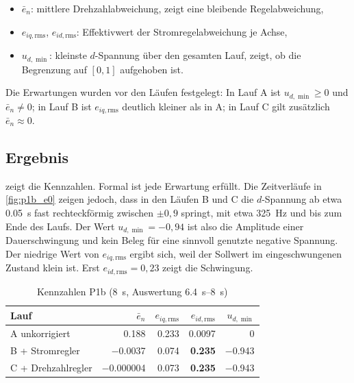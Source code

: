 \begin{itemize}
  \item $\bar e_n$: mittlere Drehzahlabweichung, zeigt eine bleibende Regelabweichung,
  \item $e_{iq,\mathrm{rms}}$, $e_{id,\mathrm{rms}}$: Effektivwert der Stromregelabweichung
    je Achse,
  \item $u_{d,\min}$: kleinste $d$-Spannung über den gesamten Lauf, zeigt, ob die
    Begrenzung auf $[0, 1]$ aufgehoben ist.
\end{itemize}

Die Erwartungen wurden vor den Läufen festgelegt: In Lauf A ist $u_{d,\min} \geq 0$ und
$\bar e_n \neq 0$; in Lauf B ist $e_{iq,\mathrm{rms}}$ deutlich kleiner als in A; in Lauf C
gilt zusätzlich $\bar e_n \approx 0$.

\subsection{Ergebnis}

 zeigt die Kennzahlen. Formal ist jede Erwartung erfüllt. Die Zeitverläufe
in \cref{fig:p1b_e0} zeigen jedoch, dass in den Läufen B und C die $d$-Spannung ab etwa
\SI{0,05}{\second} fast rechteckförmig zwischen $\pm 0{,}9$ springt, mit etwa
\SI{325}{\hertz} und bis zum Ende des Laufs. Der Wert $u_{d,\min} = -0{,}94$ ist also die
Amplitude einer Dauerschwingung und kein Beleg für eine sinnvoll genutzte negative
Spannung. Der niedrige Wert von $e_{iq,\mathrm{rms}}$ ergibt sich, weil der Sollwert im
eingeschwungenen Zustand klein ist. Erst $e_{id,\mathrm{rms}} = 0{,}23$ zeigt die Schwingung.

\begin{table}[htbp]
  \centering
  \caption{Kennzahlen P1b (\SI{8}{\second}, Auswertung \SIrange{6,4}{8}{\second})}
  \label{tab:p1b}
  \small
  \begin{tabular}{@{}lrrrr@{}}
    \toprule
    Lauf & $\bar e_n$ & $e_{iq,\mathrm{rms}}$ & $e_{id,\mathrm{rms}}$ & $u_{d,\min}$ \\
    \midrule
    A unkorrigiert & \num{0,188} & \num{0,233} & \num{0,0097} & \num{0} \\
    B + Stromregler & \num{-0,0037} & \num{0,074} & \textbf{\num{0,235}} & \num{-0,943} \\
    C + Drehzahlregler & \num{-0,000004} & \num{0,073} & \textbf{\num{0,235}} & \num{-0,943} \\
    \bottomrule
  \end{tabular}
\end{table}

